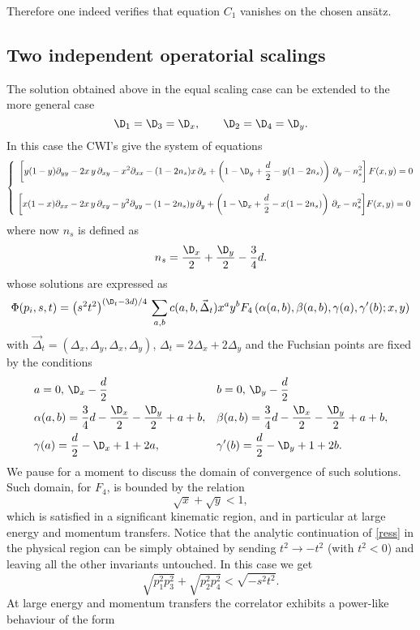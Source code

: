 \documentclass[a4paper,11pt,openright,twoside]{book}
\let\a=\alpha   \let\b=\beta   \let\g=\gamma   \let\d=\delta
\numberwithin{equation}{section}
\begin{document}
{Therefore one indeed verifies that equation $C_1$ vanishes on the chosen ans\"atz.

\subsection{Two independent operatorial scalings }
The solution obtained above in the equal scaling case can be extended to the more general case 
\begin{equation}
	\D_1=\D_3=\D_x,\qquad \D_2=\D_4=\D_y.
\end{equation}
In this case the CWI's  give the system of equations
\begin{equation}
	\left\{\,\,
	\begin{aligned}
		&\left[y(1-y)\partial_{yy} -2x\,y\,\partial_{xy}-x^2\partial_{xx}-(1-2n_s)x\,\partial_x+\left(1-\D_y+\frac{d}{2}-y(1-2n_s)\right)\,\partial_y-n_s^2\right] F(x,y)=0\\[2ex]
		&\bigg[x(1-x)\partial_{xx} -2x\,y\,\partial_{xy}-y^2\partial_{yy}-(1-2n_s)y\,\partial_y+\left(1-\D_x+\frac{d}{2}-x(1-2n_s)\right)\,\partial_x-n_s^2\bigg] F(x,y)=0
	\end{aligned}\right.
\end{equation}
where now $n_s$ is defined as 
\begin{equation}
	n_s=\frac{\D_x}{2}+\frac{\D_y}{2}-\frac{3}{4}d.
\end{equation}
whose solutions are expressed as
\begin{equation}
	\label{ress}
	\Phi(p_i,s,t)=\big(s^2t^2\big)^{(\D_t-3d)/4}\,\sum_{a,b} c(a,b,\vec\Delta_t) x^a y^bF_4\left(\a(a,b),\b(a,b),\gamma(a),\g'(b);x,y\right)
\end{equation}
with $\vec\Delta_t=(\Delta_x,\Delta_y,\Delta_x,\Delta_y)$, $\Delta_t=2 \Delta_x + 2 \Delta_y$ and the Fuchsian points are fixed by the conditions
\begin{align}
	&a=0,\,\D_x-\frac{d}{2}&&b=0,\,\D_y-\frac{d}{2}\notag\\
	&\a(a,b)=\frac{3}{4}d-\frac{\D_x}{2}-\frac{\D_y}{2}+a+b,&&\b(a,b)=\frac{3}{4}d-\frac{\D_x}{2}-\frac{\D_y}{2}+a+b,\notag\\
	&\gamma(a)=\frac{d}{2}-\D_x+1+2a,&&\g'(b)=\frac{d}{2}-\D_y+1+2b.
\end{align}
We pause for a moment to discuss the domain of convergence of such solutions. Such domain, for $F_4$, is bounded by the relation 
\begin{equation}
	\sqrt{x}+\sqrt{y}< 1, 
\end{equation}
which is satisfied in a significant kinematic region, and in particular at large energy and momentum transfers. Notice that the analytic continuation of \eqref{ress} in the physical region can be simply obtained by sending $t^2\to -t^2$ (with $t^2<0$) and leaving all the other invariants untouched. In this case we get
\begin{equation}
	\sqrt{p_1^2 p_3^2}  +\sqrt{p_2^2 p_4^2} < \sqrt{- s^2 t^2}.
\end{equation}
At large energy and momentum transfers the correlator exhibits a power-like behaviour of the form 

}
\end{document}

